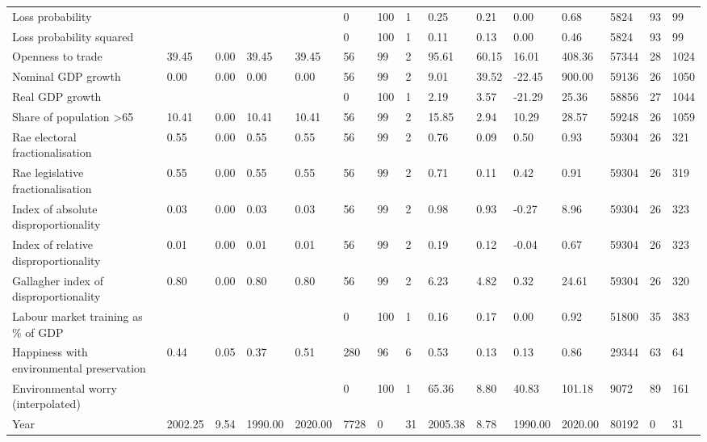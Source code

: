 \begin{longtable}{lllllllllllllll}
\addlinespace
Loss probability &  &  &  &  & 0 & 100 & 1 & 0.25 & 0.21 & 0.00 & 0.68 & 5824 & 93 & 99\\
Loss probability squared &  &  &  &  & 0 & 100 & 1 & 0.11 & 0.13 & 0.00 & 0.46 & 5824 & 93 & 99\\
Openness to trade & 39.45 & 0.00 & 39.45 & 39.45 & 56 & 99 & 2 & 95.61 & 60.15 & 16.01 & 408.36 & 57344 & 28 & 1024\\
Nominal GDP growth & 0.00 & 0.00 & 0.00 & 0.00 & 56 & 99 & 2 & 9.01 & 39.52 & -22.45 & 900.00 & 59136 & 26 & 1050\\
Real GDP growth &  &  &  &  & 0 & 100 & 1 & 2.19 & 3.57 & -21.29 & 25.36 & 58856 & 27 & 1044\\
\addlinespace
Share of population >65 & 10.41 & 0.00 & 10.41 & 10.41 & 56 & 99 & 2 & 15.85 & 2.94 & 10.29 & 28.57 & 59248 & 26 & 1059\\
Rae electoral fractionalisation & 0.55 & 0.00 & 0.55 & 0.55 & 56 & 99 & 2 & 0.76 & 0.09 & 0.50 & 0.93 & 59304 & 26 & 321\\
Rae legislative fractionalisation & 0.55 & 0.00 & 0.55 & 0.55 & 56 & 99 & 2 & 0.71 & 0.11 & 0.42 & 0.91 & 59304 & 26 & 319\\
Index of absolute disproportionality & 0.03 & 0.00 & 0.03 & 0.03 & 56 & 99 & 2 & 0.98 & 0.93 & -0.27 & 8.96 & 59304 & 26 & 323\\
Index of relative disproportionality & 0.01 & 0.00 & 0.01 & 0.01 & 56 & 99 & 2 & 0.19 & 0.12 & -0.04 & 0.67 & 59304 & 26 & 323\\
\addlinespace
Gallagher index of disproportionality & 0.80 & 0.00 & 0.80 & 0.80 & 56 & 99 & 2 & 6.23 & 4.82 & 0.32 & 24.61 & 59304 & 26 & 320\\
Labour market training as \% of GDP &  &  &  &  & 0 & 100 & 1 & 0.16 & 0.17 & 0.00 & 0.92 & 51800 & 35 & 383\\
Happiness with environmental preservation & 0.44 & 0.05 & 0.37 & 0.51 & 280 & 96 & 6 & 0.53 & 0.13 & 0.13 & 0.86 & 29344 & 63 & 64\\
Environmental worry (interpolated) &  &  &  &  & 0 & 100 & 1 & 65.36 & 8.80 & 40.83 & 101.18 & 9072 & 89 & 161\\
Year & 2002.25 & 9.54 & 1990.00 & 2020.00 & 7728 & 0 & 31 & 2005.38 & 8.78 & 1990.00 & 2020.00 & 80192 & 0 & 31\\
\bottomrule
\end{longtable}

